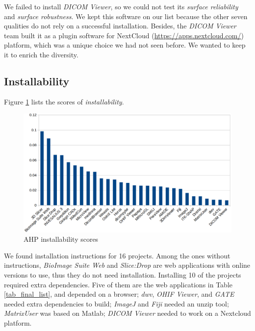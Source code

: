 \documentclass[preprint,12pt,authoryear]{elsarticle}
\begin{document}
We failed to install \textit{DICOM Viewer}, so we could not test its
\textit{surface reliability} and \textit{surface robustness}. We kept this
software on our list because the other seven qualities do not rely on a
successful installation. Besides, the \textit{DICOM Viewer} team built it as a
plugin software for NextCloud
(\hyperlink{https://apps.nextcloud.com/}{https://apps.nextcloud.com/}) platform,
which was a unique choice we had not seen before. We wanted to keep it to enrich
the diversity.

\subsection{Installability} \label{sec_result_installability}

Figure \ref{fg_installability_scores} lists the scores of
\textit{installability}.

\begin{figure}[ht]
\includegraphics[scale=0.38]{figures/installability_scores.png}
\caption{AHP installability scores}
\label{fg_installability_scores}
\end{figure}

We found installation instructions for 16 projects. Among the ones without
instructions, \textit{BioImage Suite Web} and \textit{Slice:Drop} are web
applications with online versions to use, thus they do not need installation.
Installing 10 of the projects required extra dependencies. Five of them are the
web applications in Table \ref{tab_final_list}, and depended on a browser;
\textit{dwv}, \textit{OHIF Viewer}, and \textit{GATE} needed extra dependencies
to build; \textit{ImageJ} and	\textit{Fiji} needed an unzip tool;
\textit{MatrixUser} was based on Matlab; \textit{DICOM Viewer} needed to work on
a Nextcloud platform.
\end{document}
